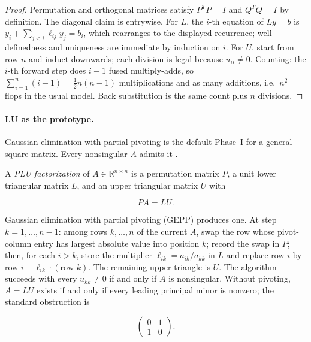 \begin{proof}
Permutation and orthogonal matrices satisfy \(P^{T}P=I\) and \(Q^{T}Q=I\) by definition. The diagonal claim is entrywise. For \(L\), the \(i\)-th equation of \(Ly=b\) is \(y_{i}+\sum_{j<i}\ell_{ij}y_{j}=b_{i}\), which rearranges to the displayed recurrence; well-definedness and uniqueness are immediate by induction on \(i\). For \(U\), start from row \(n\) and induct downwards; each division is legal because \(u_{ii}\neq 0\). Counting: the \(i\)-th forward step does \(i-1\) fused multiply-adds, so \(\sum_{i=1}^{n}(i-1)=\frac12 n(n-1)\) multiplications and as many additions, i.e.\ \(n^{2}\) flops in the usual model. Back substitution is the same count plus \(n\) divisions.
\end{proof}

\paragraph{LU as the prototype.}

Gaussian elimination with partial pivoting is the default Phase~I for a general square matrix. Every nonsingular \(A\) admits it \cite{trefethen97}.

\begin{definition}[GEPP / \(PA=LU\)]
\label{def:gepp}
A \emph{PLU factorization} of \(A\in\mathbb{R}^{n\times n}\) is a permutation matrix \(P\), a unit lower triangular matrix \(L\), and an upper triangular matrix \(U\) with

\[
PA = LU.
\]

Gaussian elimination with partial pivoting (GEPP) produces one. At step \(k=1,\ldots,n-1\): among rows \(k,\ldots,n\) of the current \(A\), swap the row whose pivot-column entry has largest absolute value into position \(k\); record the swap in \(P\); then, for each \(i>k\), store the multiplier \(\ell_{ik}=a_{ik}/a_{kk}\) in \(L\) and replace row \(i\) by row \(i-\ell_{ik}\cdot(\text{row }k)\). The remaining upper triangle is \(U\). The algorithm succeeds with every \(u_{kk}\neq 0\) if and only if \(A\) is nonsingular. Without pivoting, \(A=LU\) exists if and only if every leading principal minor is nonzero; the standard obstruction is

\[
\begin{pmatrix}
0 & 1 \\
1 & 0
\end{pmatrix}.
\]
\end{definition}


